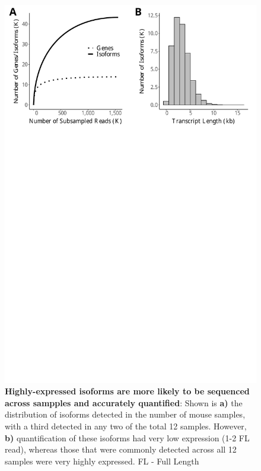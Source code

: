 \begin{figure}[htp]
	\begin{center}
		\includegraphics[page=4,trim={0 25cm 0 0},clip,scale = 0.55]{Figures/IsoSeqWholeTranscriptome.pdf}
	\end{center}
	\captionsetup{width=0.95\textwidth}
	\caption[Isoform diversity across Tg4510 samples and coverage of ERCC transcripts]%
	{\textbf{Highly-expressed isoforms are more likely to be sequenced across sampples and accurately quantified}: Shown is \textbf{a)} the distribution of isoforms detected in the number of mouse samples, with a third detected in any two of the total 12 samples. However, \textbf{b)} quantification of these isoforms had very low expression (1-2 FL read), whereas those that were commonly detected across all 12 samples were very highly expressed. FL - Full Length}
	\label{fig:isoseq_whole_lowlyexp}
\end{figure}


